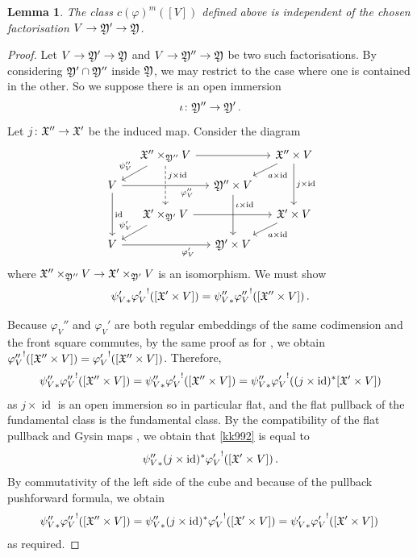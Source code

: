 \documentclass[a4paper,12pt]{article} %
\newcommand{\on}[1]{\operatorname{#1}}
\theoremstyle{definition}
\theoremstyle{plain}%
\newtheorem{lemma}[definition]{Lemma}
\renewcommand{\phi}{\varphi}
\begin{document}

\begin{lemma}\label{lem:classindepfact}
The class $c(\phi)^{m}([V])$ defined above is independent of the chosen factorisation $V \to \frak Y' \to \frak Y$. 
\end{lemma}
\begin{proof}
Let $V \to \frak Y' \to \frak Y$ and $V \to \frak Y'' \to \frak Y$ be two such factorisations. By considering $\frak Y' \cap \frak Y''$ inside $\frak Y$, we may restrict to the case where one is contained in the other. So we 
suppose there is an open immersion $$\iota\colon \frak Y'' \to \frak Y'\, .$$
Let $j\colon \frak X'' \to \frak X'$ be the induced map. Consider the diagram
\begin{equation}
\begin{tikzcd}[column sep=small, row sep = small]
 ~ & \frak X'' \times_{\frak Y''} V 	\arrow[rr] \arrow[dd, dashed, near start, "j \times \on{id}"] \arrow[dl, swap, "\psi_V''"] & ~ & \frak X'' \times V \arrow[dl, "a \times \on{id}"] \arrow[dd, "j \times \on{id}"]\\
 V \arrow[rr, near end, swap, "\phi_V''"] \arrow[dd, "\on{id}"]& ~ & \frak Y'' \times V \arrow[dd, near start, "\iota \times \on{id}"] & ~ \\
~ & \frak X' \times_{\frak Y'} V \arrow[dl, swap, "\psi_V'"] 	\arrow[rr] & ~ & \frak X' \times V \arrow[dl, "a \times \on{id}"] \\
 V  \arrow[rr, near end, swap, "\phi_V'"] &~ & \frak Y' \times V & ~ 
\end{tikzcd}
\end{equation}
where  $\frak X'' \times_{\frak Y''} V \to \frak X' \times_{\frak Y'} V$ is an isomorphism. 
We must show 
$${\psi_V'}_* {\phi_V'}^! 
([\frak X' \times V]) = {\psi_V''}_* {\phi_V''}^! ([\frak X'' \times V])\, .$$

Because $\phi_V''$ and $\phi_V'$ are both regular embeddings of the same codimension and the front square commutes, by the same proof as for \cite[Theorem 6.2(c)]{Fulton1984Intersection-th}, we obtain  ${\phi_V''}^!([\frak X '' \times V]) = {\phi_V'}^!([\frak X '' \times V])$. Therefore,
\begin{equation}\label{kk992}
{\psi_V''}_* {\phi_V''}^! ([\frak X'' \times V]) = {\psi_V''}_* {\phi_V'}^! ([\frak X'' \times V]) = {\psi_V''}_* {\phi_V'}^! ( (j \times \on{id})^*[\frak X' \times V])
\end{equation}
as $j \times \on{id}$ is an open immersion so in particular flat, and the flat pullback of the fundamental class is the fundamental class. By the compatibility of the flat pullback and Gysin maps  \cite[Section 3.1]{Kresch1999Cycle-groups-fo}, we obtain 
that \eqref{kk992} is equal to 
\[{\psi_V''}_*(j \times \on{id})^* {\phi_V'}^! ([\frak X' \times V])\, .\]
By commutativity of the left side of the cube and because of the pullback pushforward formula, we obtain  
\[{\psi_V''}_* {\phi_V''}^! ([\frak X'' \times V]) =  {\psi_V''}_*(j \times \on{id})^* {\phi_V'}^! ([\frak X' \times V]) = {\psi_V'}_* {\phi_V'}^! ([\frak X' \times V])\, \]
as required.
\end{proof}
\end{document}
